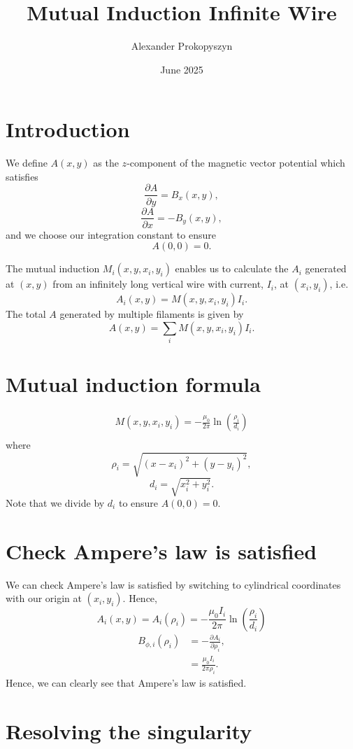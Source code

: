 \documentclass{article}
\title{Mutual Induction Infinite Wire}
\author{Alexander Prokopyszyn}
\date{June 2025}
\begin{document}
\maketitle

\section{Introduction}

We define $A(x,y)$ as the $z$-component of the magnetic vector potential which satisfies
\[\frac{\partial A}{\partial y} = B_x(x, y),\]
\[\frac{\partial A}{\partial x} = -B_y(x, y),\]
and we choose our integration constant to ensure
\[A(0,0)=0.\]

The mutual induction $M_i(x, y, x_i, y_i)$ enables us to calculate the $A_i$ generated at $(x, y)$ from an infinitely long vertical wire with current, $I_i$, at $(x_i, y_i)$, i.e.
\[A_i(x,y) = M(x, y, x_i, y_i)I_i.\]
The total $A$ generated by multiple filaments is given by
\[A(x,y) = \sum_{i} M(x, y, x_i, y_i)I_i.\]

\section{Mutual induction formula}

\[\begin{aligned}
M(x, y, x_i, y_i) = -\frac{\mu_0}{2\pi} \ln\left(\frac{\rho_i}{d_i}\right) \\
\end{aligned}\]
where
\[\rho_i = \sqrt{(x-x_i)^2+(y-y_i)^2},\]
\[d_i = \sqrt{x_i^2 + y_i^2}.\]
Note that we divide by $d_i$ to ensure $A(0,0)=0$.

\section{Check Ampere's law is satisfied}

We can check Ampere's law is satisfied by switching to cylindrical coordinates with our origin at $(x_i, y_i)$. Hence,
\[A_i(x, y) = A_i(\rho_i) =  -\frac{\mu_0I_i}{2\pi} \ln\left(\frac{\rho_i}{d_i}\right)\]
\[\begin{aligned}
B_{\phi,i}(\rho_i) &= -\frac{\partial A_i}{\partial \rho_i}, \\
&= \frac{\mu_0I_i}{2\pi\rho_i}.
\end{aligned}\]
Hence, we can clearly see that Ampere's law is satisfied.

\section{Resolving the singularity}
\end{document}

